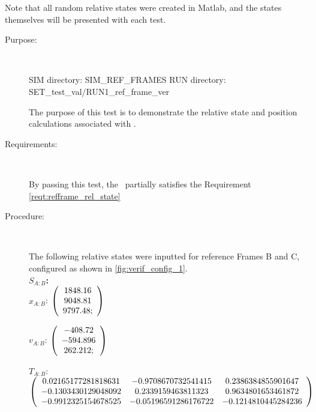 Note that all random relative states were created in Matlab, and the states
themselves will be presented with each test.

\label{test:refframe_test_1}
\begin{description}
\item[Purpose:] \ \newline

SIM directory: SIM\_REF\_FRAMES
RUN directory: SET\_test\_val/RUN1\_ref\_frame\_ver

The purpose of this test is to demonstrate the relative state and
position calculations associated with .

\item[Requirements:] \ \newline

By passing this test, the \ partially satisfies
the Requirement \ref{reqt:refframe_rel_state}

\item[Procedure:] \ \newline

The following relative states were inputted for reference Frames B and
C, configured as shown in \ref{fig:verif_config_1}. \\

\Large{\textbf{$S_{A:B}$:}} \normalsize \\

$x_{A:B}$:  $\left( \begin{array} {ccc} 1848.16 \\ 9048.81 \\ 9797.48;
\end{array} \right) \\ \\$

$v_{A:B}$:   $\left( \begin{array} {ccc}  -408.72 \\ -594.896 \\ 262.212;
\end{array} \right) \\ \\$

$T_{A:B}$:   $\left( \begin{array} {ccc}
 0.02165177281818631 & -0.9708670732541415 & 0.2386384855901647 \\
  -0.1303430129048092 & 0.2339159463811323 & 0.9634801653461872 \\
   -0.9912325154678525 & -0.05196591286176722 & -0.1214810445284236
\end{array} \right) \\ \\$


\end{description}
